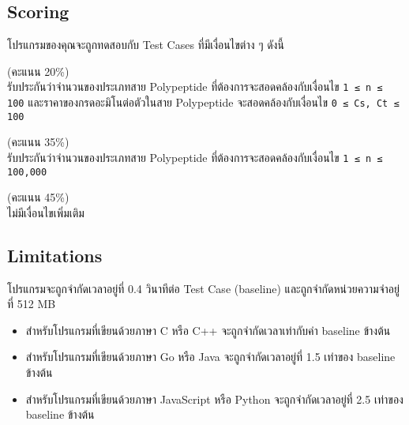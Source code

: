 \subsection{Scoring}

\noindent
โปรแกรมของคุณจะถูกทดสอบกับ Test Cases ที่มีเงื่อนไขต่าง ๆ ดังนี้

\begin{description}[topsep=0pc,itemsep=0pc]
    \item[SMALL] (คะแนน 20\%) \\
        รับประกันว่าจำนวนของประเภทสาย Polypeptide ที่ต้องการจะสอดคล้องกับเงื่อนไข \lstinline{1 ≤ n ≤ 100} และราคาของกรดอะมิโนต่อตัวในสาย Polypeptide จะสอดคล้องกับเงื่อนไข \lstinline{0 ≤ Cs, Ct ≤ 100}
    \item[MEDIUM] (คะแนน 35\%) \\
        รับประกันว่าจำนวนของประเภทสาย Polypeptide ที่ต้องการจะสอดคล้องกับเงื่อนไข \lstinline{1 ≤ n ≤ 100,000}
    \item[LARGE] (คะแนน 45\%) \\
        ไม่มีเงื่อนไขเพิ่มเติม
\end{description}


\subsection{Limitations}

\noindent
โปรแกรมจะถูกจำกัดเวลาอยู่ที่ 0.4 วินาทีต่อ Test Case (baseline) และถูกจำกัดหน่วยความจำอยู่ที่ 512 MB
\begin{itemize}[topsep=0pc,itemsep=0pc]
    \item 
        สำหรับโปรแกรมที่เขียนด้วยภาษา C หรือ C++ จะถูกจำกัดเวลาเท่ากับค่า baseline ข้างต้น
    \item 
        สำหรับโปรแกรมที่เขียนด้วยภาษา Go หรือ Java จะถูกจำกัดเวลาอยู่ที่ 1.5 เท่าของ baseline ข้างต้น
    \item 
        สำหรับโปรแกรมที่เขียนด้วยภาษา JavaScript หรือ Python จะถูกจำกัดเวลาอยู่ที่ 2.5 เท่าของ baseline ข้างต้น
\end{itemize}
